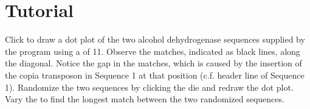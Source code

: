 \section{Tutorial}
\begin{enumerate}
  \I Click \ty{>} to draw a dot plot of the two alcohol dehydrogenase sequences
  supplied by the program using a  of 11.  
  \I Observe the matches,
  indicated as black lines, along the diagonal.  
  \I Notice the gap in
  the matches, which is caused by the insertion of the copia
  transposon in Sequence 1 at that position (c.f. header line of Sequence 1).
  \I Randomize the two sequences by clicking the die and redraw the dot plot. 
  \I Vary the  to find the longest match between the
  two randomized sequences.
\end{enumerate}





